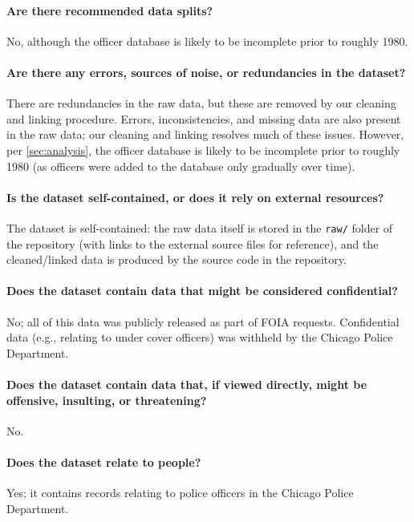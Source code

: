 \paragraph{Are there recommended data splits?}
No, although the officer database is likely to be incomplete prior to roughly 1980.

\paragraph{Are there any errors, sources of noise, or redundancies in the dataset?}
There are redundancies in the raw data, but these are removed by our cleaning and linking procedure.
Errors, inconsistencies, and missing data are also present in the raw data; our cleaning and linking
resolves much of these issues. However, per \cref{sec:analysis}, the officer database is
likely to be incomplete prior to roughly 1980 (as officers were added to the database only gradually over time).

\paragraph{Is the dataset self-contained, or does it rely on external resources?}
The dataset is self-contained: the raw data itself is stored in the \texttt{raw/} folder of the repository 
(with links to the external source files for reference), 
and the cleaned/linked data is produced by the source code in the repository.

\paragraph{Does the dataset contain data that might be considered confidential?}
No; all of this data was publicly released as part of FOIA requests. 
Confidential data (e.g., relating to under cover officers) was withheld 
by the Chicago Police Department.

\paragraph{Does the dataset contain data that, if viewed directly, might be offensive, insulting, or threatening?}
No.

\paragraph{Does the dataset relate to people?} 
Yes; it contains records relating to police officers in the Chicago Police Department.

